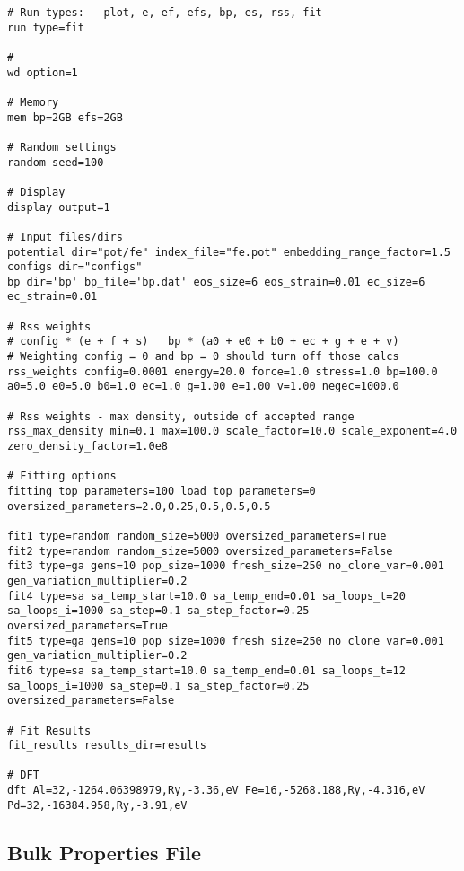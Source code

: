 \begin{lstlisting}[style=sPseudo,caption={Iron potential input file for fitting.}]
# Run types:   plot, e, ef, efs, bp, es, rss, fit
run type=fit

#
wd option=1

# Memory
mem bp=2GB efs=2GB

# Random settings
random seed=100

# Display
display output=1

# Input files/dirs
potential dir="pot/fe" index_file="fe.pot" embedding_range_factor=1.5
configs dir="configs"
bp dir='bp' bp_file='bp.dat' eos_size=6 eos_strain=0.01 ec_size=6 ec_strain=0.01

# Rss weights
# config * (e + f + s)   bp * (a0 + e0 + b0 + ec + g + e + v)
# Weighting config = 0 and bp = 0 should turn off those calcs
rss_weights config=0.0001 energy=20.0 force=1.0 stress=1.0 bp=100.0 a0=5.0 e0=5.0 b0=1.0 ec=1.0 g=1.00 e=1.00 v=1.00 negec=1000.0

# Rss weights - max density, outside of accepted range
rss_max_density min=0.1 max=100.0 scale_factor=10.0 scale_exponent=4.0 zero_density_factor=1.0e8

# Fitting options
fitting top_parameters=100 load_top_parameters=0 oversized_parameters=2.0,0.25,0.5,0.5,0.5

fit1 type=random random_size=5000 oversized_parameters=True
fit2 type=random random_size=5000 oversized_parameters=False
fit3 type=ga gens=10 pop_size=1000 fresh_size=250 no_clone_var=0.001 gen_variation_multiplier=0.2
fit4 type=sa sa_temp_start=10.0 sa_temp_end=0.01 sa_loops_t=20 sa_loops_i=1000 sa_step=0.1 sa_step_factor=0.25 oversized_parameters=True
fit5 type=ga gens=10 pop_size=1000 fresh_size=250 no_clone_var=0.001 gen_variation_multiplier=0.2
fit6 type=sa sa_temp_start=10.0 sa_temp_end=0.01 sa_loops_t=12 sa_loops_i=1000 sa_step=0.1 sa_step_factor=0.25 oversized_parameters=False

# Fit Results
fit_results results_dir=results

# DFT
dft Al=32,-1264.06398979,Ry,-3.36,eV Fe=16,-5268.188,Ry,-4.316,eV Pd=32,-16384.958,Ry,-3.91,eV
\end{lstlisting}




\subsection{Bulk Properties File}

